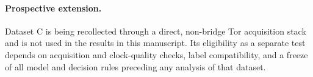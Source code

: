 \paragraph{Prospective extension.} Dataset C is being recollected through a direct, non-bridge Tor acquisition stack and is not used in the results in this manuscript. Its eligibility as a separate test depends on acquisition and clock-quality checks, label compatibility, and a freeze of all model and decision rules preceding any analysis of that dataset.
